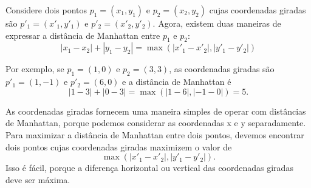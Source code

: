 Considere dois pontos $p_1=(x_1,y_1)$ e $p_2=(x_2,y_2)$ cujas coordenadas
giradas são $p'_1=(x'_1,y'_1)$ e $p'_2=(x'_2,y'_2)$.
Agora, existem duas maneiras de expressar a distância de Manhattan
entre $p_1$ e $p_2$:
\[|x_1-x_2|+|y_1-y_2| = \max(|x'_1-x'_2|,|y'_1-y'_2|)\]

Por exemplo, se $p_1=(1,0)$ e $p_2=(3,3)$,
as coordenadas giradas são $p'_1=(1,-1)$ e $p'_2=(6,0)$
e a distância de Manhattan é
\[|1-3|+|0-3| = \max(|1-6|,|-1-0|) = 5.\]

As coordenadas giradas fornecem uma maneira simples
de operar com distâncias de Manhattan, porque podemos
considerar as coordenadas x e y separadamente.
Para maximizar a distância de Manhattan entre dois pontos,
devemos encontrar dois pontos cujas
coordenadas giradas maximizem o valor de
\[\max(|x'_1-x'_2|,|y'_1-y'_2|).\]
Isso é fácil, porque a diferença horizontal ou vertical
das coordenadas giradas deve ser máxima.
